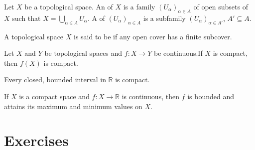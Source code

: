 \begin{definition}
	Let $X$ be a topological space. An  of $X$ is a family $(U_\alpha)_{\alpha \in A}$ of open subsets of $X$ such that $X = \bigcup_{\alpha \in A}U_\alpha$. A  of $(U_\alpha)_{\alpha \in A}$ is a subfamily $(U_\alpha)_{\alpha \in A'}$, $A' \subseteq A$.	
\end{definition}

\begin{definition}
	A topological space $X$ is said to be  if any open cover has a finite subcover.
\end{definition}

\begin{theorem}
	Let $X$ and $Y$ be topological spaces and $f: X \to Y$ be continuous.If $X$ is compact, then $f(X)$ is compact.
	\label{thm:main_theorem_compactness}
\end{theorem}

\begin{proposition}
	Every closed, bounded interval in $\mathbb{R}$ is compact.
\end{proposition}

\begin{theorem}
	If $X$ is a compact space and $f: X \to \mathbb{R}$ is continuous, then $f$ is bounded and attains its maximum and minimum values on $X$.
	\label{thm:extreme_value_theorem}
\end{theorem}

\section*{Exercises}

